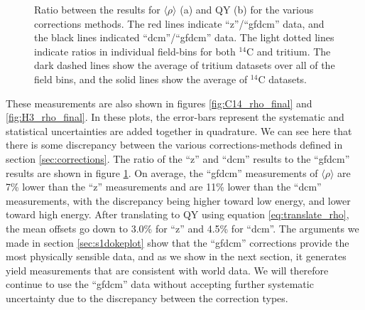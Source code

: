 \begin{figure}[!h]
\begin{subfigure}{0.5\linewidth}
\caption{}
\end{subfigure}
\caption{Ratio between the results for $\langle \rho \rangle$ (a) and QY (b) for the various corrections methods. The red lines indicate ``z''/``gfdcm'' data, and the black lines indicated ``dcm''/``gfdcm'' data. The light dotted lines indicate ratios in individual field-bins for both $^{14}$C and tritium. The dark dashed lines show the average of tritium datasets over all of the field bins, and the solid lines show the average of $^{14}$C datasets. }
\label{fig:rho_ratio}
\end{figure}

These measurements are also shown in figures \ref{fig:C14_rho_final} and \ref{fig:H3_rho_final}. In these plots, the error-bars represent the systematic and statistical uncertainties are added together in quadrature. We can see here that there is some discrepancy between the various corrections-methods defined in section \ref{sec:corrections}. The ratio of the ``z'' and ``dcm'' results to the ``gfdcm'' results are shown in figure \ref{fig:rho_ratio}. On average, the ``gfdcm'' measurements of $\langle \rho \rangle$ are 7\% lower than the ``z'' measurements and are 11\% lower than the ``dcm'' measurements, with the discrepancy being higher toward low energy, and lower toward high energy. After translating to QY using equation \ref{eq:translate_rho}, the mean offsets go down to 3.0\% for ``z'' and 4.5\% for ``dcm''. The arguments we made in section \ref{sec:s1dokeplot} show that the ``gfdcm'' corrections provide the most physically sensible data, and as we show in the next section, it generates yield measurements that are consistent with world data. We will therefore continue to use the ``gfdcm'' data without accepting further systematic uncertainty due to the discrepancy between the correction types. 

